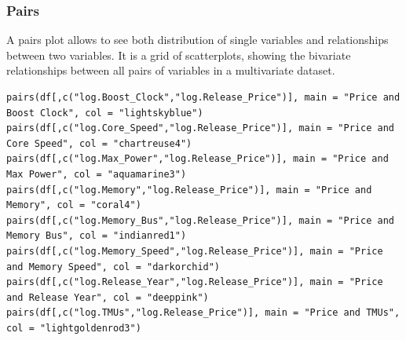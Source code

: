 \documentclass[a4paper]{article}
\begin{document}
\subsubsection{Pairs}
A pairs plot allows to see both distribution of single variables and relationships between two variables. It is a grid of scatterplots, showing the bivariate relationships between all pairs of variables in a multivariate dataset.
\begin{mdframed}[leftline=false,rightline=false,backgroundcolor=lightblue!10,nobreak=false]
    \begin{verbatim}
pairs(df[,c("log.Boost_Clock","log.Release_Price")], main = "Price and Boost Clock", col = "lightskyblue")
pairs(df[,c("log.Core_Speed","log.Release_Price")], main = "Price and Core Speed", col = "chartreuse4")
pairs(df[,c("log.Max_Power","log.Release_Price")], main = "Price and Max Power", col = "aquamarine3")
pairs(df[,c("log.Memory","log.Release_Price")], main = "Price and Memory", col = "coral4")
pairs(df[,c("log.Memory_Bus","log.Release_Price")], main = "Price and Memory Bus", col = "indianred1")
pairs(df[,c("log.Memory_Speed","log.Release_Price")], main = "Price and Memory Speed", col = "darkorchid")
pairs(df[,c("log.Release_Year","log.Release_Price")], main = "Price and Release Year", col = "deeppink")
pairs(df[,c("log.TMUs","log.Release_Price")], main = "Price and TMUs", col = "lightgoldenrod3")
    \end{verbatim}
\end{mdframed}
\end{document}
